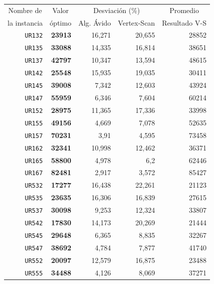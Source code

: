 \documentclass[11pt]{article}
\begin{document}
\begin{table}[htbp]
   \begin{center}
   \begin{tabular}{|r|r|r|r|r|}
   \hline
   \multicolumn{1}{|c|}{Nombre de} & \multicolumn{1}{c|}{Valor} & \multicolumn{ 2}{c|}{Desviación (\%)} & \multicolumn{1}{c|}{Promedio } \\ \cline{3-4}
   \multicolumn{1}{|c|}{la instancia} & \multicolumn{1}{c|}{óptimo} & \multicolumn{1}{c|}{Alg. Ávido} & \multicolumn{1}{c|}{Vertex-Scan} & \multicolumn{1}{c|}{Resultado V-S} \\ \hline
   \texttt{UR132} & \textbf{23913} & 16,271 & 20,655 & 28852 \\
   \texttt{UR135} & \textbf{33088} & 14,335 & 16,814 & 38651 \\
   \texttt{UR137} & \textbf{42797} & 10,347 & 13,594 & 48615 \\
   \texttt{UR142} & \textbf{25548} & 15,935 & 19,035 & 30411 \\
   \texttt{UR145} & \textbf{39008} & 7,342 & 12,603 & 43924 \\
   \texttt{UR147} & \textbf{55959} & 6,346 & 7,604 & 60214 \\
   \texttt{UR152} & \textbf{28975} & 11,365 & 17,336 & 33998 \\
   \texttt{UR155} & \textbf{49156} & 4,669 & 7,078 & 52635 \\
   \texttt{UR157} & \textbf{70231} & 3,91 & 4,595 & 73458 \\
   \texttt{UR162} & \textbf{32341} & 10,998 & 12,462 & 36371 \\
   \texttt{UR165} & \textbf{58800} & 4,978 & 6,2 & 62446 \\
   \texttt{UR167} & \textbf{82481} & 2,917 & 3,572 & 85427 \\
   \texttt{UR532} & \textbf{17277} & 16,438 & 22,261 & 21123 \\
   \texttt{UR535} & \textbf{23635} & 16,306 & 16,839 & 27615 \\
   \texttt{UR537} & \textbf{30098} & 9,253 & 12,324 & 33807 \\
   \texttt{UR542} & \textbf{17830} & 14,173 & 20,269 & 21444 \\
   \texttt{UR545} & \textbf{29648} & 6,365 & 8,835 & 32267 \\
   \texttt{UR547} & \textbf{38692} & 4,784 & 7,877 & 41740 \\
   \texttt{UR552} & \textbf{20097} & 12,579 & 16,875 & 23488 \\
   \texttt{UR555} & \textbf{34488} & 4,126 & 8,069 & 37271 \\

\end{tabular}
\end{center}
\end{table}
\end{document}
